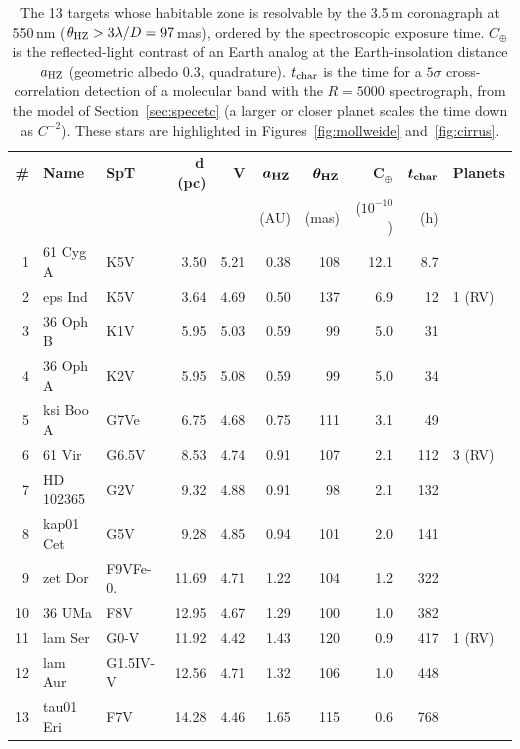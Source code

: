 \begin{table}[tp]
\centering
\small
\setlength{\tabcolsep}{5pt}
\begin{tabular}{r l l r r r r r r l}
\toprule
\textbf{\#} & \textbf{Name} & \textbf{SpT} & \textbf{d\,(pc)} & \textbf{V} & $\boldsymbol{a_{\rm HZ}}$ & $\boldsymbol{\theta_{\rm HZ}}$ & $\boldsymbol{C_{\oplus}}$ & $\boldsymbol{t_{\rm char}}$ & \textbf{Planets} \\
 & & & & & (AU) & (mas) & ($10^{-10}$) & (h) & \\
\midrule
1 & 61 Cyg A & K5V & 3.50 & 5.21 & 0.38 & 108 & 12.1 & 8.7 &  \\
2 & eps Ind & K5V & 3.64 & 4.69 & 0.50 & 137 & 6.9 & 12 & 1 (RV) \\
3 & 36 Oph B & K1V & 5.95 & 5.03 & 0.59 & 99 & 5.0 & 31 &  \\
4 & 36 Oph A & K2V & 5.95 & 5.08 & 0.59 & 99 & 5.0 & 34 &  \\
5 & ksi Boo A & G7Ve & 6.75 & 4.68 & 0.75 & 111 & 3.1 & 49 &  \\
6 & 61 Vir & G6.5V & 8.53 & 4.74 & 0.91 & 107 & 2.1 & 112 & 3 (RV) \\
7 & HD 102365 & G2V & 9.32 & 4.88 & 0.91 & 98 & 2.1 & 132 &  \\
8 & kap01 Cet & G5V & 9.28 & 4.85 & 0.94 & 101 & 2.0 & 141 &  \\
9 & zet Dor & F9VFe-0. & 11.69 & 4.71 & 1.22 & 104 & 1.2 & 322 &  \\
10 & 36 UMa & F8V & 12.95 & 4.67 & 1.29 & 100 & 1.0 & 382 &  \\
11 & lam Ser & G0-V & 11.92 & 4.42 & 1.43 & 120 & 0.9 & 417 & 1 (RV) \\
12 & lam Aur & G1.5IV-V & 12.56 & 4.71 & 1.32 & 106 & 1.0 & 448 &  \\
13 & tau01 Eri & F7V & 14.28 & 4.46 & 1.65 & 115 & 0.6 & 768 &  \\
\bottomrule
\end{tabular}
\caption{The 13 targets whose habitable zone is resolvable by the 3.5\,m coronagraph at 550\,nm ($\theta_{\rm HZ}>3\lambda/D=97$\,mas), ordered by the spectroscopic exposure time. $C_\oplus$ is the reflected-light contrast of an Earth analog at the Earth-insolation distance $a_{\rm HZ}$ (geometric albedo 0.3, quadrature). $t_{\rm char}$ is the time for a $5\sigma$ cross-correlation detection of a molecular band with the $R=5000$ spectrograph, from the model of Section~\ref{sec:specetc} (a larger or closer planet scales the time down as $C^{-2}$). These stars are highlighted in Figures~\ref{fig:mollweide} and~\ref{fig:cirrus}.}
\label{tab:hztargets}
\end{table}
